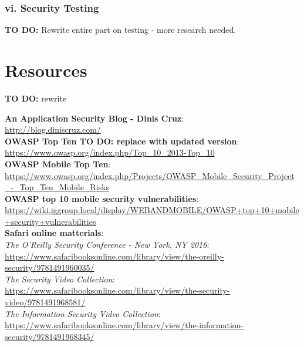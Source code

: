 \documentclass[a5paper,pagesize,10pt,bibtotoc,DIV=10,twoside]{scrbook}
\begin{document}
\subsection{\textbf{vi.} Security Testing}

\textbf{TO DO:} Rewrite entire part on testing - more research needed.


\chapter{Resources}

\textbf{TO DO:} rewrite

\small{
\hspace*{-1cm}\textbf{An Application Security Blog - Dinis Cruz}: \\
\url{http://blog.diniscruz.com/}\\

\hspace*{-1cm}\textbf{OWASP Top Ten \textbf{TO DO: replace with updated version}}: \\
\url{https://www.owasp.org/index.php/Top_10_2013-Top_10}\\

\hspace*{-1cm}\textbf{OWASP Mobile Top Ten}: \\
\url{https://www.owasp.org/index.php/Projects/OWASP_Mobile_Security_Project_-_Top_Ten_Mobile_Risks}\\

\hspace*{-1cm}\textbf{OWASP top 10 mobile security vulnerabilities}: \\
\url{https://wiki.iggroup.local/display/WEBANDMOBILE/OWASP+top+10+mobile+security+vulnerabilities}\\

\hspace*{-1cm}\textbf{Safari online matterials}: \\

\hspace*{-1cm}\textit{The O'Reilly Security Conference - New York, NY 2016}:\\
 \url{https://www.safaribooksonline.com/library/view/the-oreilly-security/9781491960035/}\\

\hspace*{-1cm}\textit{The Security Video Collection}: \\
\url{https://www.safaribooksonline.com/library/view/the-security-video/9781491968581/}\\

\hspace*{-1cm}\textit{The Information Security Video Collection}: \\
\url{https://www.safaribooksonline.com/library/view/the-information-security/9781491968345/}\\
}
\end{document}
